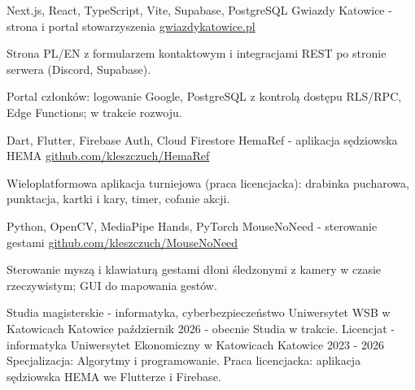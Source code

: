 \documentclass[11pt,a4paper]{awesome-cv}
\begin{document}

\begin{cventries}
  \cventry
    {Next.js, React, TypeScript, Vite, Supabase, PostgreSQL}
    {Gwiazdy Katowice - strona i portal stowarzyszenia}
    {\href{https://www.gwiazdykatowice.pl/pl}{\fontsize{8pt}{1em}\selectfont gwiazdykatowice.pl}}
    {}
    {\begin{cvitems}
      \item {Strona PL/EN z formularzem kontaktowym i integracjami REST po stronie serwera (Discord, Supabase).}
      \item {Portal członków: logowanie Google, PostgreSQL z kontrolą dostępu RLS/RPC, Edge Functions; w trakcie rozwoju.}
    \end{cvitems}}
  \vspace{5mm}
  \cventry
    {Dart, Flutter, Firebase Auth, Cloud Firestore}
    {HemaRef - aplikacja sędziowska HEMA}
    {\href{https://github.com/kleszczuch/HemaRef}{\fontsize{8pt}{1em}\selectfont github.com/kleszczuch/HemaRef}}
    {}
    {\begin{cvitems}
      \item {Wieloplatformowa aplikacja turniejowa (praca licencjacka): drabinka pucharowa, punktacja, kartki i kary, timer, cofanie akcji.}
    \end{cvitems}}
  \vspace{5mm}
  \cventry
    {Python, OpenCV, MediaPipe Hands, PyTorch}
    {MouseNoNeed - sterowanie gestami}
    {\href{https://github.com/kleszczuch/MouseNoNeed}{\fontsize{8pt}{1em}\selectfont github.com/kleszczuch/MouseNoNeed}}
    {}
    {\begin{cvitems}
      \item {Sterowanie myszą i klawiaturą gestami dłoni śledzonymi z kamery w czasie rzeczywistym; GUI do mapowania gestów.}
    \end{cvitems}}
\end{cventries}

\vspace{2mm}

\begin{cventries}
  \cventry
    {Studia magisterskie - informatyka, cyberbezpieczeństwo}
    {Uniwersytet WSB w Katowicach}
    {Katowice}
    {październik 2026 - obecnie}
    {Studia w trakcie.}
  \vspace{2mm}
  \cventry
    {Licencjat - informatyka}
    {Uniwersytet Ekonomiczny w Katowicach}
    {Katowice}
    {2023 - 2026}
    {Specjalizacja: Algorytmy i programowanie. Praca licencjacka: aplikacja sędziowska HEMA we Flutterze i Firebase.}
\end{cventries}
\end{document}
